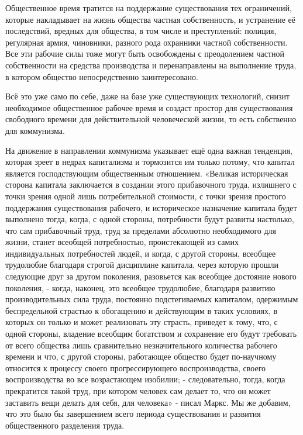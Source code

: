 \documentclass[../main]{subfiles}
\begin{document}
Общественное время тратится на поддержание существования тех ограничений, которые накладывает на жизнь общества частная собственность, и устранение её последствий, вредных для общества, в том числе и преступлений: полиция, регулярная армия, чиновники, разного рода охранники частной собственности. Все эти рабочие силы тоже могут быть освобождены с преодолением частной собственности на средства производства и перенаправлены на выполнение труда, в котором общество непосредственно заинтересовано.

Всё это уже само по себе, даже на базе уже существующих технологий, снизит необходимое общественное рабочее время и создаст простор для существования свободного времени для действительной человеческой жизни, то есть собственно для коммунизма.

На движение в направлении коммунизма указывает ещё одна важная тенденция, которая зреет в недрах капитализма и тормозится им только потому, что капитал является господствующим общественным отношением. «Великая историческая сторона капитала заключается в создании этого прибавочного труда, излишнего с точки зрения одной лишь потребительной стоимости, с точки зрения простого поддержания существования рабочего, и историческое назначение капитала будет выполнено тогда, когда, с одной стороны, потребности будут развиты настолько, что сам прибавочный труд, труд за пределами абсолютно необходимого для жизни, станет всеобщей потребностью, проистекающей из самих индивидуальных потребностей людей, и когда, с другой стороны, всеобщее трудолюбие благодаря строгой дисциплине капитала, через которую прошли следующие друг за другом поколения, разовьется как всеобщее достояние нового поколения, - когда, наконец, это всеобщее трудолюбие, благодаря развитию производительных сила труда, постоянно подстегиваемых капиталом, одержимым беспредельной страстью к обогащению и действующим в таких условиях, в которых он только и может реализовать эту страсть, приведет к тому, что, с одной стороны, владение всеобщим богатством и сохранение его будут требовать от всего общества лишь сравнительно незначительного количества рабочего времени и что, с другой стороны, работающее общество будет по-научному относится к процессу своего прогрессирующего воспроизводства, своего воспроизводства во все возрастающем изобилии; - следовательно, тогда, когда прекратится такой труд, при котором человек сам делает то, что он может заставить вещи делать для себя, для человека» - писал Маркс. Мы же добавим, что это было бы завершением всего периода существования и развития общественного разделения труда.
\end{document}
